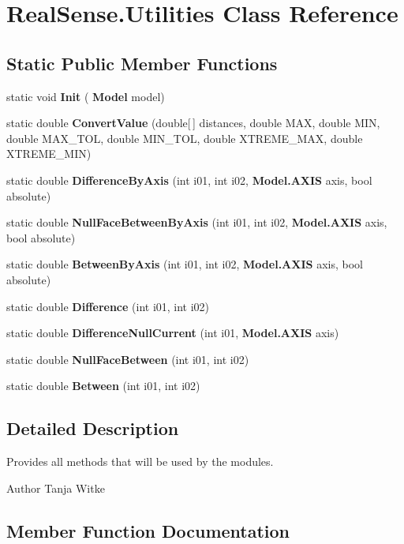\section{Real\+Sense.\+Utilities Class Reference}
\label{class_real_sense_1_1_utilities}
\subsection*{Static Public Member Functions}
\begin{DoxyCompactItemize}
\item 
static void \textbf{ Init} (\textbf{ Model} model)
\item 
static double \textbf{ Convert\+Value} (double[$\,$] distances, double M\+AX, double M\+IN, double M\+A\+X\+\_\+\+T\+OL, double M\+I\+N\+\_\+\+T\+OL, double X\+T\+R\+E\+M\+E\+\_\+\+M\+AX, double X\+T\+R\+E\+M\+E\+\_\+\+M\+IN)
\item 
static double \textbf{ Difference\+By\+Axis} (int i01, int i02, \textbf{ Model.\+A\+X\+IS} axis, bool absolute)
\item 
static double \textbf{ Null\+Face\+Between\+By\+Axis} (int i01, int i02, \textbf{ Model.\+A\+X\+IS} axis, bool absolute)
\item 
static double \textbf{ Between\+By\+Axis} (int i01, int i02, \textbf{ Model.\+A\+X\+IS} axis, bool absolute)
\item 
static double \textbf{ Difference} (int i01, int i02)
\item 
static double \textbf{ Difference\+Null\+Current} (int i01, \textbf{ Model.\+A\+X\+IS} axis)
\item 
static double \textbf{ Null\+Face\+Between} (int i01, int i02)
\item 
static double \textbf{ Between} (int i01, int i02)
\end{DoxyCompactItemize}


\subsection{Detailed Description}
Provides all methods that will be used by the modules.

\begin{DoxyAuthor}{Author}
Tanja Witke 
\end{DoxyAuthor}


\subsection{Member Function Documentation}
\mbox{\label{class_real_sense_1_1_utilities_ac8eceed552d66f2f614160cf84e605e2}} 
